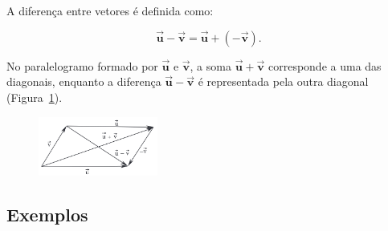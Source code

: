 A diferença entre vetores é definida como:

\[
\mathbf{\overrightarrow{u}} - \mathbf{\overrightarrow{v}} =
\mathbf{\overrightarrow{u}} + (-\mathbf{\overrightarrow{v}}).
\]

No paralelogramo formado por $\mathbf{\overrightarrow{u}}$ e
$\mathbf{\overrightarrow{v}}$, a soma $\mathbf{\overrightarrow{u}} +
\mathbf{\overrightarrow{v}}$ corresponde a uma das diagonais, enquanto a
diferença $\mathbf{\overrightarrow{u}} - \mathbf{\overrightarrow{v}}$ é
representada pela outra diagonal (Figura~\ref{fig:fig1.18}).

\begin{figure}[H]
    \centering
    \includegraphics[width=0.35\textwidth]{./fig/fig1.18.png}
    \caption{}\label{fig:fig1.18}
\end{figure}

\newpage

\subsection{Exemplos}



